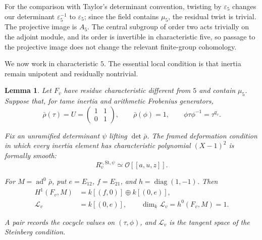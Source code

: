 \documentclass[11pt,a4paper]{article}
\newtheorem{lemma}[theorem]{Lemma}
\numberwithin{equation}{section}
\begin{document}
For the comparison with Taylor's determinant convention, twisting by \(\varepsilon_5\) changes our determinant \(\varepsilon_5^{-1}\) to \(\varepsilon_5\); since the field contains \(\mu_5\), the residual twist is trivial. The projective image is \(A_5\). The central subgroup of order two acts trivially on the adjoint module, and its order is invertible in characteristic five, so passage to the projective image does not change the relevant finite-group cohomology.

We now work in characteristic \(5\). The essential local condition is that inertia remain unipotent and residually nontrivial.

\begin{lemma}\label{lem:3.1}
Let \(F_v\) have residue characteristic different from \(5\) and contain \(\mu_5\). Suppose that, for tame inertia and arithmetic Frobenius generators,
\begin{equation*}
\bar\rho(\tau)=U=\begin{pmatrix}1&1\\0&1\end{pmatrix},
\qquad \bar\rho(\phi)=1,
\qquad \phi\tau\phi^{-1}=\tau^{q_v}.
\end{equation*}

Fix an unramified determinant \(\psi\) lifting \(\det\bar\rho\). The framed deformation condition in which every inertia element has characteristic polynomial \((X-1)^2\) is formally smooth:
\begin{equation*}
R_v^{\square,\mathrm{St},\psi}\simeq\mathcal O[[a,u,z]].
\end{equation*}

For \(M=\operatorname{ad}^0\bar\rho\), put \(e=E_{12}\), \(f=E_{21}\), and \(h=\operatorname{diag}(1,-1)\). Then
\begin{align*}
H^1(F_v,M)&=k[(f,0)]\oplus k[(0,e)],\\
\mathcal L_v&=k[(0,e)],
\qquad \dim_k\mathcal L_v=h^0(F_v,M)=1.
\end{align*}

A pair records the cocycle values on \((\tau,\phi)\), and \(\mathcal L_v\) is the tangent space of the Steinberg condition.
\end{lemma}
\end{document}
